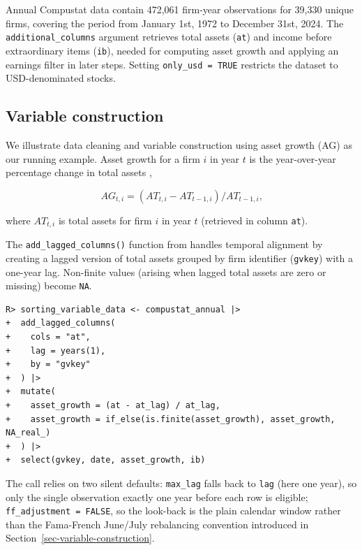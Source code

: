 \documentclass[
  article]{jss}
\begin{document}
Annual Compustat data contain 472,061 firm-year observations for 39,330
unique firms, covering the period from January 1st, 1972 to December
31st, 2024. The \texttt{additional\_columns} argument retrieves total
assets (\texttt{at}) and income before extraordinary items
(\texttt{ib}), needed for computing asset growth and applying an
earnings filter in later steps. Setting \texttt{only\_usd\ =\ TRUE}
restricts the dataset to USD-denominated stocks.

\subsection{Variable construction}\label{sec-data-cleaning}

We illustrate data cleaning and variable construction using asset growth
(AG) as our running example. Asset growth for a firm \(i\) in year \(t\)
is the year-over-year percentage change in total assets
\citep{cooper.2008},

\[
AG_{t,i} = (AT_{t,i} - AT_{t-1,i}) / AT_{t-1,i}\text{,}
\]

where \(AT_{t,i}\) is total assets for firm \(i\) in year \(t\)
(retrieved in column \texttt{at}).

The \texttt{add\_lagged\_columns()} function from 
handles temporal alignment by creating a lagged version of total assets
grouped by firm identifier (\texttt{gvkey}) with a one-year lag.
Non-finite values (arising when lagged total assets are zero or missing)
become \texttt{NA}.

\begin{verbatim}
R> sorting_variable_data <- compustat_annual |>
+  add_lagged_columns(
+    cols = "at",
+    lag = years(1),
+    by = "gvkey"
+  ) |>
+  mutate(
+    asset_growth = (at - at_lag) / at_lag,
+    asset_growth = if_else(is.finite(asset_growth), asset_growth, NA_real_)
+  ) |>
+  select(gvkey, date, asset_growth, ib)
\end{verbatim}

The call relies on two silent defaults: \texttt{max\_lag} falls back to
\texttt{lag} (here one year), so only the single observation exactly one
year before each row is eligible; \texttt{ff\_adjustment\ =\ FALSE}, so
the look-back is the plain calendar window rather than the Fama-French
June/July rebalancing convention introduced in
Section~\ref{sec-variable-construction}.
\end{document}
